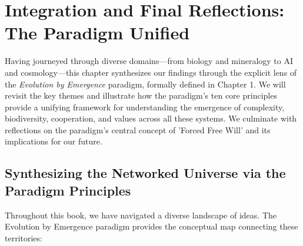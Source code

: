 \documentclass[12pt,openany]{book}
\begin{document}
\chapter{Integration and Final Reflections: The Paradigm Unified} %
\label{ch:Integration}

Having journeyed through diverse domains—from biology and mineralogy to AI and cosmology—this chapter synthesizes our findings through the explicit lens of the \emph{Evolution by Emergence} paradigm, formally defined in Chapter 1. We will revisit the key themes and illustrate how the paradigm's ten core principles provide a unifying framework for understanding the emergence of complexity, biodiversity, cooperation, and values across all these systems. We culminate with reflections on the paradigm's central concept of 'Forced Free Will' and its implications for our future. %

\section{Synthesizing the Networked Universe via the Paradigm Principles} %
Throughout this book, we have navigated a diverse landscape of ideas. The Evolution by Emergence paradigm provides the conceptual map connecting these territories:
\end{document}
